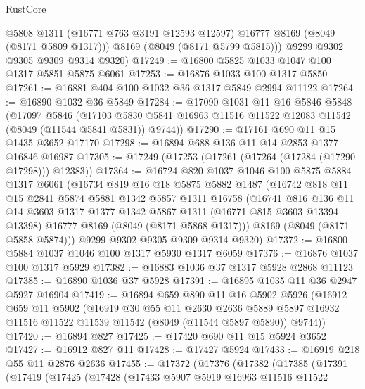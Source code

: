 \begin{lexlean}{RustCore}
\begin{coremodule}
          @5808
          @1311
          (@16771 @763 @3191 @12593 @12597)
          @16777
          @8169
          (@8049 (@8171 @5809 @1317)))
        @8169
        (@8049 (@8171 @5799 @5815)))
      @9299
      @9302
      @9305
      @9309
      @9314
      @9320)
@17249 := @16800 @5825 @1033 @1047 @100 @1317 @5851 @5875 @6061
@17253 := @16876 @1033 @100 @1317 @5850
@17261 := @16881 @404 @100 @1032 @36 @1317 @5849 @2994 @11122
@17264 := @16890 @1032 @36 @5849
@17284 := @17090
    @1031
    @11
    @16
    @5846
    @5848
    (@17097
      @5846
      (@17103 @5830 @5841 @16963 @11516 @11522 @12083 @11542 (@8049 (@11544 @5841 @5831)) @9744))
@17290 := @17161 @690 @11 @15 @1435 @3652 @17170
@17298 := @16894 @688 @136 @11 @14 @2853 @1377 @16846 @16987
@17305 := @17249 (@17253 (@17261 (@17264 (@17284 (@17290 @17298))) @12383))
@17364 := @16724
    @820
    @1037
    @1046
    @100
    @5875
    @5884
    @1317
    @6061
    (@16734
      @819
      @16
      @18
      @5875
      @5882
      @1487
      (@16742
        @818
        @11
        @15
        @2841
        @5874
        @5881
        @1342
        @5857
        @1311
        @16758
        (@16741
          @816
          @136
          @11
          @14
          @3603
          @1317
          @1377
          @1342
          @5867
          @1311
          (@16771 @815 @3603 @13394 @13398)
          @16777
          @8169
          (@8049 (@8171 @5868 @1317)))
        @8169
        (@8049 (@8171 @5858 @5874)))
      @9299
      @9302
      @9305
      @9309
      @9314
      @9320)
@17372 := @16800 @5884 @1037 @1046 @100 @1317 @5930 @1317 @6059
@17376 := @16876 @1037 @100 @1317 @5929
@17382 := @16883 @1036 @37 @1317 @5928 @2868 @11123
@17385 := @16890 @1036 @37 @5928
@17391 := @16895 @1035 @11 @36 @2947 @5927 @16904
@17419 := @16894
    @659
    @890
    @11
    @16
    @5902
    @5926
    (@16912
      @659
      @11
      @5902
      (@16919
        @30
        @55
        @11
        @2630
        @2636
        @5889
        @5897
        @16932
        @11516
        @11522
        @11539
        @11542
        (@8049 (@11544 @5897 @5890))
        @9744))
@17420 := @16894 @827
@17425 := @17420 @690 @11 @15 @5924 @3652
@17427 := @16912 @827 @11
@17428 := @17427 @5924
@17433 := @16919 @218 @55 @11 @2876 @2636
@17455 := @17372
    (@17376
      (@17382
        (@17385
          (@17391
            (@17419
              (@17425
                (@17428
                  (@17433
                    @5907
                    @5919
                    @16963
                    @11516
                    @11522

\end{coremodule}
\end{lexlean}
